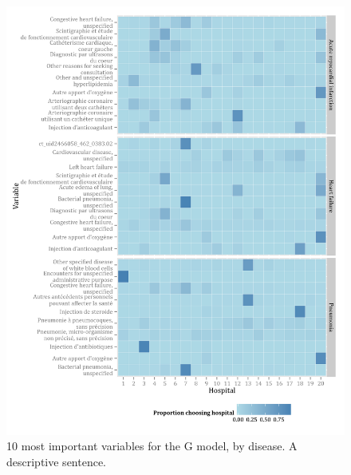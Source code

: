 \documentclass[]{article}
\begin{document}
\begin{figure}[H]
    \includegraphics{../figures/top_10_variable_importance_and_hospital.png}
    \caption[Error rate for random forest model of hospital choice.]
      {10 most important variables for the G model, by disease. A descriptive sentence.}
    \label{fig:top_10_variable_importance_and_hospital}
\end{figure}
\end{document}
